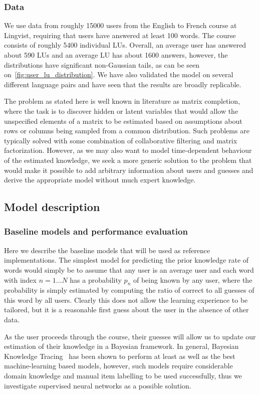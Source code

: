 \subsubsection{Data}
We use data from roughly 15000 users from the English to French course at Lingvist, requiring that users have answered at least 100 words. The course consists of roughly 5400 individual LUs. Overall, an average user has answered about 590 LUs and an average LU has about 1600 answers, however, the distributions have significant non-Gaussian tails, as can be seen on~\cref{fig:user_lu_distribution}. We have also validated the model on several different language pairs and have seen that the results are broadly replicable.

The problem as stated here is well known in literature as matrix completion\cite{candes2009exact}, where the task is to discover hidden or latent variables that would allow the unspecified elements of a matrix to be estimated based on assumptions about rows or columns being sampled from a common distribution. Such problems are typically solved with some combination of collaborative filtering and matrix factorization. However, as we may also want to model time-dependent behaviour of the estimated knowledge, we seek a more generic solution to the problem that would make it possible to add arbitrary information about users and guesses and derive the appropriate model without much expert knowledge.

\subsection{Model description}

\subsubsection{Baseline models and performance evaluation}

Here we describe the baseline models that will be used as reference implementations. The simplest model for predicting the prior knowledge rate of words would simply be to assume that any user is an average user and each word with index $n=1 \dots N$ has a probability $p_n$ of being known by any user, where the probability is simply estimated by computing the ratio of correct to all guesses of this word by all users. Clearly this does not allow the learning experience to be tailored, but it is a reasonable first guess about the user in the absence of other data.

As the user proceeds through the course, their guesses will allow us to update our estimation of their knowledge in a Bayesian framework. In general, Bayesian Knowledge Tracing~\cite{corbett1994knowledge} has been shown to perform at least as well as the best machine-learning based models, however, such models require considerable domain knowledge and manual item labelling to be used successfully\cite{khajah2016deep}, thus we investigate supervised neural networks as a possible solution.

